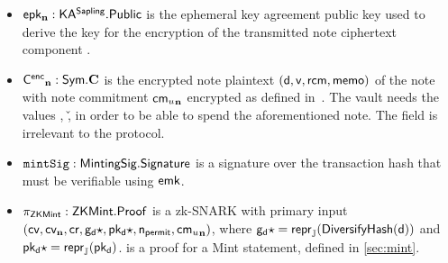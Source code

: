 \begin{itemize}
    \item $\mathsf{epk_{\mathbf{n}}} : \mathsf{KA^{Sapling}}.\mathsf{Public}$ is the ephemeral key agreement public key used to derive the key for the encryption of the transmitted note ciphertext component \cencn.
    
    \item $\mathsf{{C^{enc}}_{\mathbf{n}}} : \mathsf{Sym}.\mathbf{C}$ is the encrypted note plaintext $(\mathsf{d}, \mathsf{v}, \mathsf{rcm}, \mathsf{memo})$ of the note with note commitment $\mathsf{{cm_{\mathnormal{u}}}_{\mathbf{n}}}$ encrypted as defined in~\cite[Section 4.17.1]{hopwood2016zcash}.
    The vault needs the values \dvf, \v, \rcm in order to be able to spend the aforementioned note.
    The \memo field is irrelevant to the \zclaim protocol.
    
    \item $\mathtt{mintSig} : \mathsf{MintingSig}.\mathsf{Signature}$ is a signature over the \sighash transaction hash that must be verifiable using $\mathsf{emk}$.
    
    \item $\pi_{\mathsf{ZKMint}} : \mathsf{ZKMint}.\mathsf{Proof}$ is a \groth zk-SNARK with primary input $(\mathsf{cv}, \mathsf{cv_{\mathbf{n}}}, \mathsf{cr}, \mathsf{g_d\star}, \mathsf{pk_d\star}, \mathsf{n_{permit}}, \mathsf{{cm_{\mathnormal{u}}}_{\mathbf{n}}})$, where $\mathsf{g_d\star} = \mathsf{repr}_{\mathbb{J}}(\mathsf{DiversifyHash}(\mathsf{d}))$ and $\mathsf{pk_d\star} = \mathsf{repr}_{\mathbb{J}}(\mathsf{pk_d})$.
    \pim is a proof for a Mint statement, defined in \cref{sec:mint}.
\end{itemize}

